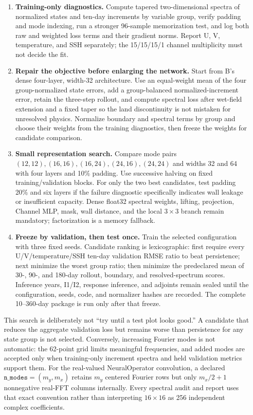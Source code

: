 \documentclass[11pt]{article}
\begin{document}
\begin{enumerate}
\item \textbf{Training-only diagnostics.}  Compute tapered two-dimensional spectra of
  normalized states and ten-day increments by variable group, verify padding and
  mode indexing, run a stronger 96-sample memorization test, and log both raw and
  weighted loss terms and their gradient norms.  Report U, V, temperature, and SSH
  separately; the 15/15/15/1 channel multiplicity must not decide the fit.
\item \textbf{Repair the objective before enlarging the network.}  Start from B's dense
  four-layer, width-32 architecture.  Use an equal-weight mean of the four
  group-normalized state errors, add a group-balanced normalized-increment error, retain
  the three-step rollout, and compute spectral loss after wet-field extension and a
  fixed taper so the land discontinuity is not mistaken for unresolved physics.
  Normalize boundary and spectral terms by group and choose their weights from the
  training diagnostics, then freeze the weights for candidate comparison.
\item \textbf{Small representation search.}  Compare mode pairs
  \((12,12),(16,16),(16,24),(24,16),(24,24)\) and widths 32 and 64 with four layers and
  10\% padding.  Use successive halving on fixed training/validation blocks.  For only
  the two best candidates, test padding 20\% and six layers if the failure diagnostic
  specifically indicates wall leakage or insufficient capacity.  Dense float32
  spectral weights, lifting, projection, Channel MLP, mask, wall distance, and the local
  \(3\times3\) branch remain mandatory; factorization is a memory fallback.
\item \textbf{Freeze by validation, then test once.}  Train the selected configuration
  with three fixed seeds.  Candidate ranking is lexicographic: first require every
  U/V/temperature/SSH ten-day validation RMSE ratio to beat persistence; next minimize
  the worst group ratio; then minimize the predeclared mean of 30-, 90-, and 180-day
  rollout, boundary, and resolved-spectrum scores.  Inference years, I1/I2, response
  inference, and adjoints remain sealed until the configuration, seeds, code, and
  normalizer hashes are recorded.  The complete 10--360-day package is run only after
  that freeze.
\end{enumerate}

This search is deliberately not ``try until a test plot looks good.''  A candidate that
reduces the aggregate validation loss but remains worse than persistence for any state
group is not selected.  Conversely, increasing Fourier modes is not automatic: the
62-point grid limits meaningful frequencies, and added modes are accepted only when
training-only increment spectra and held validation metrics support them.
For the real-valued NeuralOperator convolution, a declared
\(\texttt{n\_modes}=(m_y,m_x)\) retains \(m_y\) centered Fourier rows but only
\(m_x/2+1\) nonnegative real-FFT columns internally.  Every spectral audit and report
uses that exact convention rather than interpreting \(16\times16\) as 256 independent
complex coefficients.
\end{document}

